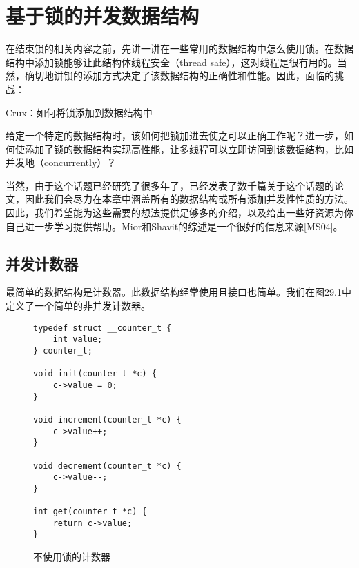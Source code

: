 \chapter{基于锁的并发数据结构}
\thispagestyle{empty}

在结束锁的相关内容之前，先讲一讲在一些常用的数据结构中怎么使用锁。在数据结构中添加锁能够让此结构体线程安全（thread safe），这对线程是很有用的。当然，确切地讲锁的添加方式决定了该数据结构的正确性和性能。因此，面临的挑战：

\begin{tcolorbox}[colframe=grey,colback= grey,arc=0pt,left=6pt,right=6pt,top=6pt,bottom=6pt,boxsep=0pt]
\begin{center}Crux：如何将锁添加到数据结构中\end{center}
给定一个特定的数据结构时，该如何把锁加进去使之可以正确工作呢？进一步，如何使添加了锁的数据结构实现高性能，让多线程可以立即访问到该数据结构，比如并发地（concurrently）？
\end{tcolorbox}

当然，由于这个话题已经研究了很多年了，已经发表了数千篇关于这个话题的论文，因此我们会尽力在本章中涵盖所有的数据结构或所有添加并发性性质的方法。因此，我们希望能为这些需要的想法提供足够多的介绍，以及给出一些好资源为你自己进一步学习提供帮助。Mior和Shavit的综述是一个很好的信息来源[MS04]。

\section{并发计数器}
最简单的数据结构是计数器。此数据结构经常使用且接口也简单。我们在图29.1中定义了一个简单的非并发计数器。

\begin{figure}[h]
\begin{lstlisting}
typedef struct __counter_t {
    int value;
} counter_t;

void init(counter_t *c) { 
    c->value = 0;
}
    
void increment(counter_t *c) {
    c->value++;
}

void decrement(counter_t *c) {
    c->value--;
}

int get(counter_t *c) { 
    return c->value;
}
\end{lstlisting}
\caption{不使用锁的计数器}
\end{figure}

